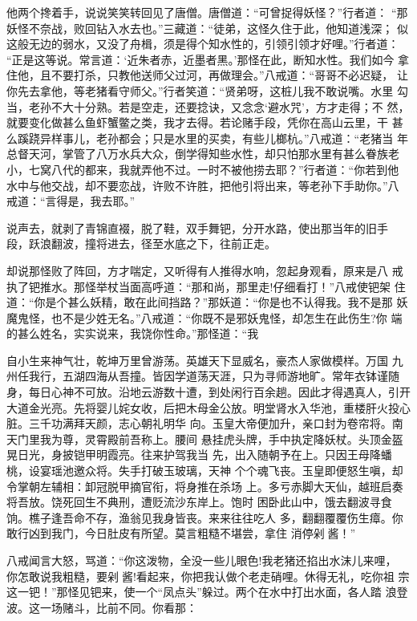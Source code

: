 他两个搀着手，说说笑笑转回见了唐僧。唐僧道：“可曾捉得妖怪？”行者道：
“那妖怪不奈战，败回钻入水去也。”三藏道：“徒弟，这怪久住于此，他知道浅深；
似这般无边的弱水，又没了舟楫，须是得个知水性的，引领引领才好哩。”行者道：
“正是这等说。常言道：‘近朱者赤，近墨者黑。’那怪在此，断知水性。我们如今
拿住他，且不要打杀，只教他送师父过河，再做理会。”八戒道：“哥哥不必迟疑，
让你先去拿他，等老猪看守师父。”行者笑道：“贤弟呀，这桩儿我不敢说嘴。水里
勾当，老孙不大十分熟。若是空走，还要捻诀，又念念‘避水咒’，方才走得；不
然，就要变化做甚么鱼虾蟹鳖之类，我才去得。若论赌手段，凭你在高山云里，干
甚么蹊跷异样事儿，老孙都会；只是水里的买卖，有些儿榔杭。”八戒道：“老猪当
年总督天河，掌管了八万水兵大众，倒学得知些水性，却只怕那水里有甚么眷族老
小，七窝八代的都来，我就弄他不过。一时不被他捞去耶？”行者道：“你若到他
水中与他交战，却不要恋战，许败不许胜，把他引将出来，等老孙下手助你。”八
戒道：“言得是，我去耶。”

说声去，就剥了青锦直裰，脱了鞋，双手舞钯，分开水路，使出那当年的旧手
段，跃浪翻波，撞将进去，径至水底之下，往前正走。

却说那怪败了阵回，方才喘定，又听得有人推得水响，忽起身观看，原来是八
戒执了钯推水。那怪举杖当面高呼道：“那和尚，那里走!仔细看打！”八戒使钯架
住道：“你是个甚么妖精，敢在此间挡路？”那妖道：“你是也不认得我。我不是那
妖魔鬼怪，也不是少姓无名。”八戒道：“你既不是邪妖鬼怪，却怎生在此伤生?你
端的甚么姓名，实实说来，我饶你性命。”那怪道：“我

自小生来神气壮，乾坤万里曾游荡。英雄天下显威名，豪杰人家做模样。万国
九州任我行，五湖四海从吾撞。皆因学道荡天涯，只为寻师游地旷。常年衣钵谨随
身，每日心神不可放。沿地云游数十遭，到处闲行百余趟。因此才得遇真人，引开
大道金光亮。先将婴儿姹女收，后把木母金公放。明堂肾水入华池，重楼肝火投心
脏。三千功满拜天颜，志心朝礼明华
向。玉皇大帝便加升，亲口封为卷帘将。南天门里我为尊，灵霄殿前吾称上。腰间
悬挂虎头牌，手中执定降妖杖。头顶金盔晃日光，身披铠甲明霞亮。往来护驾我当
先，出入随朝予在上。只因王母降蟠桃，设宴瑶池邀众将。失手打破玉玻璃，天神
个个魂飞丧。玉皇即便怒生嗔，却令掌朝左辅相：卸冠脱甲摘官衔，将身推在杀场
上。多亏赤脚大天仙，越班启奏将吾放。饶死回生不典刑，遭贬流沙东岸上。饱时
困卧此山中，饿去翻波寻食饷。樵子逢吾命不存，渔翁见我身皆丧。来来往往吃人
多，翻翻覆覆伤生瘴。你敢行凶到我门，今日肚皮有所望。莫言粗糙不堪尝，拿住
消停剁酱！”

八戒闻言大怒，骂道：“你这泼物，全没一些儿眼色!我老猪还掐出水沫儿来哩，
你怎敢说我粗糙，要剁酱!看起来，你把我认做个老走硝哩。休得无礼，吃你祖
宗这一钯！”那怪见钯来，使一个“凤点头”躲过。两个在水中打出水面，各人踏
浪登波。这一场赌斗，比前不同。你看那：

